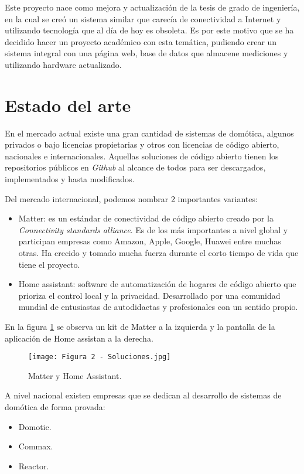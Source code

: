 Este proyecto nace como mejora y actualización de la tesis de grado de ingeniería, en la cual se creó un sistema similar que carecía de conectividad a Internet y utilizando tecnología que al día de hoy es obsoleta. Es por este motivo que se ha decidido hacer un proyecto académico con esta temática, pudiendo crear un sistema integral con una página web, base de datos que almacene mediciones y utilizando hardware actualizado.

\section{Estado del arte}

En el mercado actual existe una gran cantidad de sistemas de domótica, algunos privados o bajo licencias propietarias y otros con licencias de código abierto, nacionales e internacionales. Aquellas soluciones de código abierto tienen los repositorios públicos en \textit{Github} al alcance de todos para ser descargados, implementados y hasta modificados.

Del mercado internacional, podemos nombrar 2 importantes variantes:
\begin{itemize}
	\item Matter: es un estándar de conectividad de código abierto creado por la \textit{Connectivity standards alliance}. Es de los más importantes a nivel global y participan empresas como Amazon, Apple, Google, Huawei entre muchas otras. Ha crecido y tomado mucha fuerza durante el corto tiempo de vida que tiene el proyecto. \citep{3}
	\item Home assistant: software de automatización de hogares de código abierto que prioriza el control local y la privacidad. Desarrollado por una comunidad mundial de entusiastas de autodidactas y profesionales con un sentido propio. \citep{4}
\end{itemize}

En la figura \ref{fig:3} se observa un kit de Matter a la izquierda y la pantalla de la aplicación de Home assistan a la derecha.

\begin{figure}[h]
\centering
\texttt{[image: Figura 2 - Soluciones.jpg]}
\caption[Matter y Home Assistant]{Matter y Home Assistant. \protect\footnotemark}
\label{fig:3}
\end{figure}

A nivel nacional existen empresas que se dedican al desarrollo de sistemas de domótica de forma provada:
\begin{itemize}
	\item Domotic. \citep{5}
	\item Commax. \citep{6}
	\item Reactor. \citep{7}
\end{itemize}

